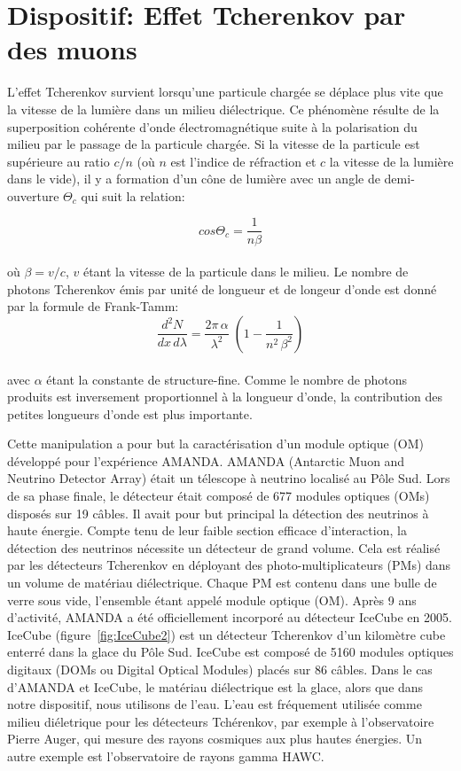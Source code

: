 \section{Dispositif: Effet Tcherenkov par des muons}
\label{sect:Tcherenkov_muon}

L'effet Tcherenkov survient lorsqu'une particule chargée se déplace plus vite que la vitesse de la lumière dans un milieu diélectrique. Ce phénomène résulte de la superposition cohérente d'onde électromagnétique suite à la polarisation du milieu par le passage de la particule chargée. Si la vitesse de la particule est supérieure au ratio $c/n$ (où $n$ est l'indice de réfraction et $c$ la vitesse de la lumière dans le vide), il y a formation d'un cône de lumière avec un angle de demi-ouverture $\Theta_c$ qui suit la relation:

\begin{equation}
    cos\Theta_c = \frac{1}{n\beta}
\end{equation}\\
où $\beta = v/c$, $v$ étant la vitesse de la particule dans le milieu. Le nombre de photons Tcherenkov émis par unité de longueur et de longeur d'onde est donné par la formule de Frank-Tamm:
\begin{equation}
     \frac{d^2N}{dx \, d\lambda} = \frac{2\pi \, \alpha}{\lambda^2} \; (1- \frac{1}{n^2 \, \beta^2} )
\end{equation}\\
avec $\alpha$ étant la constante de structure-fine. Comme le nombre de photons produits est inversement proportionnel à la longueur d'onde, la contribution des petites longueurs d'onde est plus importante.

Cette manipulation a pour but la caractérisation d'un module optique (OM) développé pour l'expérience AMANDA. AMANDA (Antarctic Muon and Neutrino Detector Array) était  un télescope à neutrino localisé au Pôle Sud. Lors de sa phase finale, le détecteur était composé de 677 modules optiques (OMs) disposés sur 19 câbles. Il avait pour but principal la détection des neutrinos à haute énergie. Compte tenu de leur faible section efficace d'interaction, la détection des neutrinos nécessite un détecteur de grand volume. Cela est réalisé par les détecteurs Tcherenkov en déployant des photo-multiplicateurs (PMs) dans un volume de matériau diélectrique. Chaque PM est contenu dans une bulle de verre sous vide, l'ensemble étant appelé module optique (OM). Après 9 ans d'activité, AMANDA a été officiellement incorporé au détecteur IceCube en 2005. IceCube (figure~\ref{fig:IceCube2}) est un détecteur Tcherenkov d'un kilomètre cube enterré dans la glace du Pôle Sud. IceCube est composé de 5160 modules optiques digitaux (DOMs ou Digital Optical Modules) placés sur 86 câbles. Dans le cas d'AMANDA et IceCube, le matériau diélectrique est la glace, alors que dans notre dispositif, nous utilisons de l'eau. L’eau est fréquement utilisée comme milieu diéletrique pour les détecteurs Tchérenkov, par exemple à l'observatoire Pierre Auger, qui mesure des rayons cosmiques aux plus hautes énergies. Un autre exemple est l'observatoire de rayons gamma HAWC.

